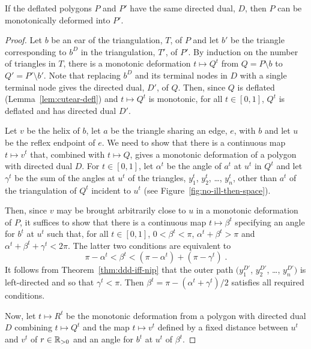 \documentclass[11pt]{amsart}
\begin{document}

\begin{theorem}
  \label{thm:defl-dd-eq}
  If the deflated polygons $P$ and $P'$ have the same directed dual,
  $D$, then $P$ can be monotonically deformed into $P'$.
\end{theorem}
\begin{proof}
  Let $b$ be an ear of the triangulation, $T$, of $P$ and let $b'$ be
  the triangle corresponding to $b^D$ in the triangulation, $T'$, of
  $P'$.  By induction on the number of triangles in $T$, there is a
  monotonic deformation $t\mapsto Q^t$ from $Q = P\setminus b$ to $Q'
  = P'\setminus b'$.  Note that replacing $b^D$ and its terminal nodes
  in $D$ with a single terminal node gives the directed dual, $D'$, of
  $Q$.  Then, since $Q$ is deflated (Lemma~\ref{lem:cutear-defl}) and
  $t\mapsto Q^t$ is monotonic, for all $t\in [0,1]$, $Q^t$ is deflated
  and has directed dual $D'$.
  
  Let $v$ be the helix of $b$, let $a$ be the triangle sharing an
  edge, $e$, with $b$ and let $u$ be the reflex endpoint of $e$.  We
  need to show that there is a continuous map $t\mapsto v^t$ that,
  combined with $t\mapsto Q$, gives a monotonic deformation of a
  polygon with directed dual $D$.  For $t\in [0,1]$, let $\alpha^t$ be
  the angle of $a^t$ at $u^t$ in $Q^t$ and let $\gamma^t$ be the sum
  of the angles at $u^t$ of the triangles, $y_1^t$, $y_2^t$, \ldots,
  $y_n^t$, other than $a^t$ of the triangulation of $Q^t$ incident to
  $u^t$ (see Figure~\ref{fig:no-ill-then-space}).
  
  Then, since $v$ may be brought arbitrarily close to $u$ in a
  monotonic deformation of $P$, it suffices to show that there is a
  continuous map $t\mapsto \beta^t$ specifying an angle for $b^t$ at
  $u^t$ such that, for all $t\in [0,1]$, $0 < \beta^t < \pi$,
  $\alpha^t + \beta^t > \pi$ and $\alpha^t + \beta^t + \gamma^t <
  2\pi$.  The latter two conditions are equivalent to
  \[
    \pi - \alpha^t < \beta^t < (\pi - \alpha^t) + (\pi - \gamma^t)\;.
  \]
  It follows from Theorem~\ref{thm:ddd-iff-nip} that the outer path
  $(y_1^{D'}$, $y_2^{D'}$, \ldots, $y_n^{D'})$ is left-directed and so
  that $\gamma^t < \pi$.  Then $\beta^t = \pi - (\alpha^t
  + \gamma^t)/2$ satisfies all required conditions.
  
  Now, let $t\mapsto R^t$ be the monotonic deformation from a polygon
  with directed dual $D$ combining $t\mapsto Q^t$ and the map
  $t\mapsto v^t$ defined by a fixed distance between $u^t$ and $v^t$
  of $r\in\mathbb{R}_{>0}$ and an angle for $b^t$ at $u^t$ of
  $\beta^t$.
  

\end{proof}
\end{document}
